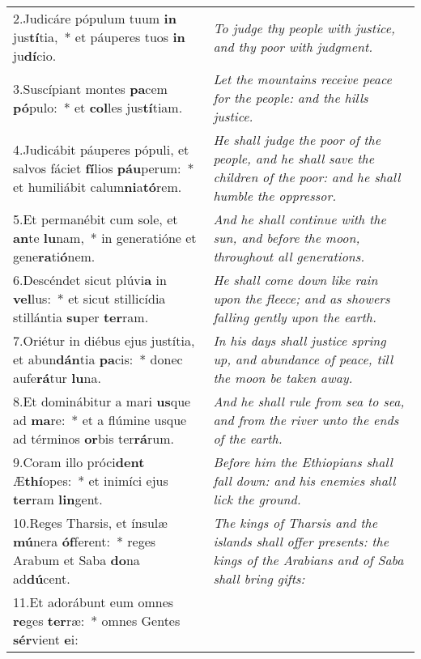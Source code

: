 \begin{longtable}{@{\hskip0pt} p{10cm} | p{6cm} @{\hskip0pt}}
2.\enspace Judicáre pópulum tuum \textbf{in} jus\textbf{tí}tia,~* et páuperes tuos \textbf{in} ju\textbf{dí}cio.
 & \textit{\small To judge thy people with justice, and thy poor with judgment.
}\\
3.\enspace Suscípiant montes \textbf{pa}cem \textbf{pó}pulo:~* et \textbf{col}les jus\textbf{tí}tiam.
 & \textit{\small Let the mountains receive peace for the people: and the hills justice.
}\\
4.\enspace Judicábit páuperes pópuli, et salvos fáciet \textbf{fí}lios \textbf{páu}perum:~* et humiliábit calum\textbf{ni}a\textbf{tó}rem.
 & \textit{\small He shall judge the poor of the people, and he shall save the children of the poor: and he shall humble the oppressor.
}\\
5.\enspace Et permanébit cum sole, et \textbf{an}te \textbf{lu}nam,~* in generatióne et gene\textbf{ra}ti\textbf{ó}nem.
 & \textit{\small And he shall continue with the sun, and before the moon, throughout all generations.
}\\
6.\enspace Descéndet sicut plúvi\textbf{a} in \textbf{vel}lus:~* et sicut stillicídia stillántia \textbf{su}per \textbf{ter}ram.
 & \textit{\small He shall come down like rain upon the fleece; and as showers falling gently upon the earth.
}\\
7.\enspace Oriétur in diébus ejus justítia, et abun\textbf{dán}tia \textbf{pa}cis:~* donec aufe\textbf{rá}tur \textbf{lu}na.
 & \textit{\small In his days shall justice spring up, and abundance of peace, till the moon be taken away.
}\\
8.\enspace Et dominábitur a mari \textbf{us}que ad \textbf{ma}re:~* et a flúmine usque ad términos \textbf{or}bis ter\textbf{rá}rum.
 & \textit{\small And he shall rule from sea to sea, and from the river unto the ends of the earth.
}\\
9.\enspace Coram illo próci\textbf{dent} Æ\textbf{thí}opes:~* et inimíci ejus \textbf{ter}ram \textbf{lin}gent.
 & \textit{\small Before him the Ethiopians shall fall down: and his enemies shall lick the ground.
}\\
10.\enspace Reges Tharsis, et ínsulæ \textbf{mú}nera \textbf{óf}ferent:~* reges Arabum et Saba \textbf{do}na ad\textbf{dú}cent.
 & \textit{\small The kings of Tharsis and the islands shall offer presents: the kings of the Arabians and of Saba shall bring gifts:
}\\
11.\enspace Et adorábunt eum omnes \textbf{re}ges \textbf{ter}ræ:~* omnes Gentes \textbf{sér}vient \textbf{e}i:

\end{longtable}
